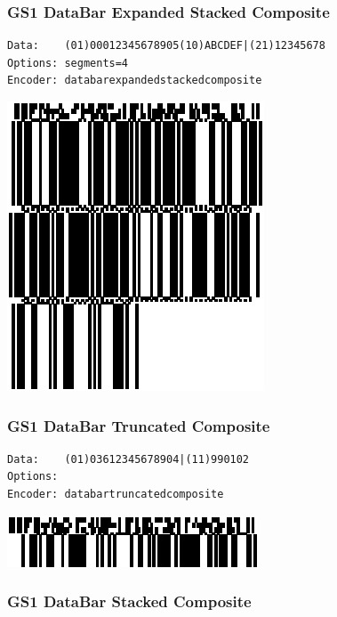\hypertarget{gs1-databar-expanded-stacked-composite}{%
\subsubsection{GS1 DataBar Expanded Stacked
Composite}\label{gs1-databar-expanded-stacked-composite}}

\begin{verbatim}
Data:    (01)00012345678905(10)ABCDEF|(21)12345678
Options: segments=4
Encoder: databarexpandedstackedcomposite
\end{verbatim}

\includegraphics{images/databarexpandedstackedcomposite-1.eps}

\hypertarget{gs1-databar-truncated-composite}{%
\subsubsection{GS1 DataBar Truncated
Composite}\label{gs1-databar-truncated-composite}}

\begin{verbatim}
Data:    (01)03612345678904|(11)990102
Options: 
Encoder: databartruncatedcomposite
\end{verbatim}

\includegraphics{images/databartruncatedcomposite-1.eps}

\hypertarget{gs1-databar-stacked-composite}{%
\subsubsection{GS1 DataBar Stacked
Composite}\label{gs1-databar-stacked-composite}}

